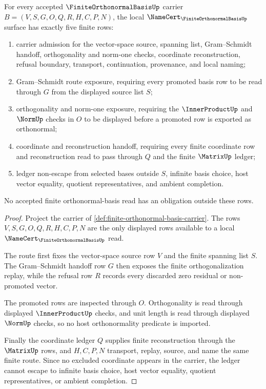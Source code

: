 \begin{theorem}
\label{thm:finite-orthonormal-basis-namecert-obligations}
For every accepted $\FiniteOrthonormalBasisUp$ carrier $B=(V,S,G,O,Q,R,H,C,P,N)$, the local $\NameCert_{\FiniteOrthonormalBasisUp}$ surface has exactly five finite rows:
\begin{enumerate}
\item carrier admission for the vector-space source, spanning list, Gram--Schmidt handoff, orthogonality and norm-one checks, coordinate reconstruction, refusal boundary, transport, continuation, provenance, and local naming;
\item Gram--Schmidt route exposure, requiring every promoted basis row to be read through $G$ from the displayed source list $S$;
\item orthogonality and norm-one exposure, requiring the $\InnerProductUp$ and $\NormUp$ checks in $O$ to be displayed before a promoted row is exported as orthonormal;
\item coordinate and reconstruction handoff, requiring every finite coordinate row and reconstruction read to pass through $Q$ and the finite $\MatrixUp$ ledger;
\item ledger non-escape from selected bases outside $S$, infinite basis choice, host vector equality, quotient representatives, and ambient completion.
\end{enumerate}
No accepted finite orthonormal-basis read has an obligation outside these rows.
\end{theorem}
\begin{proof}
Project the carrier of \autoref{def:finite-orthonormal-basis-carrier}. The rows $V,S,G,O,Q,R,H,C,P,N$ are the only displayed rows available to a local $\NameCert_{\FiniteOrthonormalBasisUp}$ read.

The route first fixes the vector-space source row $V$ and the finite spanning list $S$. The Gram--Schmidt handoff row $G$ then exposes the finite orthogonalization replay, while the refusal row $R$ records every discarded zero residual or non-promoted vector.

The promoted rows are inspected through $O$. Orthogonality is read through displayed $\InnerProductUp$ checks, and unit length is read through displayed $\NormUp$ checks, so no host orthonormality predicate is imported.

Finally the coordinate ledger $Q$ supplies finite reconstruction through the $\MatrixUp$ rows, and $H,C,P,N$ transport, replay, source, and name the same finite route. Since no excluded coordinate appears in the carrier, the ledger cannot escape to infinite basis choice, host vector equality, quotient representatives, or ambient completion.
\end{proof}

